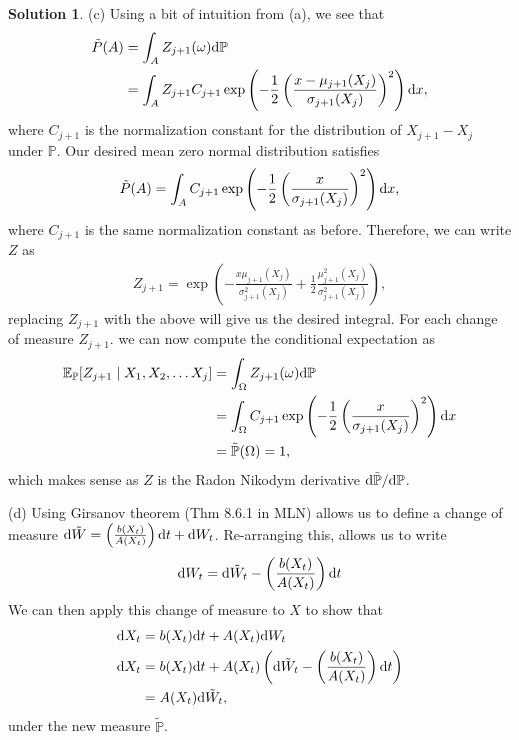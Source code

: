 \documentclass[12pt]{article}
\newcommand{\Prob}{\mathbb{P}}
\newcommand{\Expect}{\mathbb{E}}
\theoremstyle{definition}
\newtheorem{sol}{Solution}
\theoremstyle{remark}
\def\d{{\rm d}}
\begin{document}
\begin{sol}
(c) Using a bit of intuition from (a), we see that 
\begin{align*}
    \tilde{P}(A) &= \int_{A} Z_{j+1}(\omega) \d \Prob\\
                 &= \int_{A} Z_{j+1} C_{j+1} \exp\left(- \frac{1}{2} \left(\frac{x - \mu_{j+1}(X_{j})}{\sigma_{j+1}(X_{j})}\right)^{2}  \right)\d x,
\end{align*}
where $C_{j+1}$ is the normalization constant for the distribution of $X_{j+1} - X_{j}$ under $\Prob$. Our desired mean zero normal distribution satisfies 
\begin{align*}
    \tilde{P}(A) = \int_{A} C_{j+1} \exp\left(- \frac{1}{2} \left(\frac{x}{\sigma_{j+1}(X_{j})}\right)^{2}\right) \d x,
\end{align*}
where $C_{j+1}$ is the same normalization constant as before. Therefore, we can write $Z$ as
\begin{align*}
Z_{j+1} =  \exp\left(- \frac{x \mu_{j+1}(X_{j})}{\sigma^{2}_{j+1}(X_{j})} + \frac{1}{2} \frac{\mu_{j+1}^{2}(X_{j})}{\sigma^{2}_{j+1}(X_{j})}  \right),
\end{align*}
replacing $Z_{j+1}$ with the above will give us the desired integral. For each change of measure $Z_{j+1}$. we can now compute the conditional expectation as
\begin{align*}
    \Expect_{\Prob}[Z_{j+1} \mid X_{1}, X_{2}, \ldots X_{j}] &= \int_{\Omega} Z_{j+1}(\omega) \d \Prob\\
                                                       &= \int_{\Omega} C_{j+1} \exp\left(- \frac{1}{2} \left(\frac{x}{\sigma_{j+1}(X_{j})}\right)^{2} \right) \d x\\
                                                       &= \tilde{\Prob}(\Omega)= 1,
\end{align*}
which makes sense as $Z$ is the Radon Nikodym derivative $\d \tilde{\Prob} / \d \Prob$.

(d) Using Girsanov theorem (Thm 8.6.1 in MLN) allows us to define a change of measure $\d \tilde{W} =  \left( \frac{b(X_{t})}{A(X_{t})} \right) \d t + \d W_{t}$. Re-arranging this, allows us to write
\begin{align*}
    \d W_{t} = \d \tilde{W}_{t} - \left( \frac{b(X_{t})}{A(X_{t})} \right) \d t
\end{align*}
We can then apply this change of measure to $X$ to show that
\begin{align*}
    \d X_{t} &= b(X_{t}) \d t + A(X_{t}) \d W_{t}\\
    \d X_{t} &= b(X_{t}) \d t + A(X_{t}) \left(\d \tilde{W}_{t} - \left( \frac{b(X_{t})}{A(X_{t})} \right) \d t \right)\\
             &= A(X_{t}) \d \tilde{W}_{t}, 
\end{align*}
under the new measure $\tilde{\Prob}$.
\end{sol}
\newpage
\end{document}
